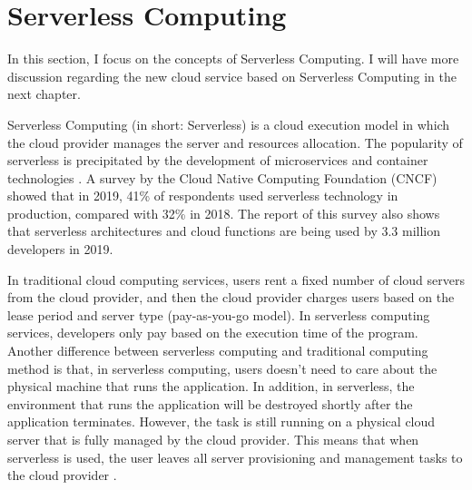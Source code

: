 \section{Serverless Computing}
In this section, I focus on the concepts of Serverless Computing. I will have more discussion regarding the new cloud service based on Serverless Computing in the next chapter.
\par
Serverless Computing (in short: Serverless) is a cloud execution model in which the cloud provider manages the server and resources allocation. 
The popularity of serverless is precipitated by the development of microservices and container technologies \cite{baldini2017serverless}. A survey by the Cloud Native Computing Foundation (CNCF) showed that in 2019, 41\% of respondents used serverless technology in production, compared with 32\% in 2018\cite{cncf2020}. The report of this survey also shows that serverless architectures and cloud functions are being used by 3.3 million developers \cite{cncf2020} in 2019.
\par
In traditional cloud computing services, users rent a fixed number of cloud servers from the cloud provider, and then the cloud provider charges users based on the lease period and server type (pay-as-you-go model). In serverless computing services, developers only pay based on the execution time of the program.
Another difference between serverless computing and traditional computing method is that, in serverless computing, users doesn't need to care about the physical machine that runs the application. In addition, in serverless, the environment that runs the application will be destroyed shortly after the application terminates. 
However, the task is still running on a physical cloud server that is fully managed by the cloud provider. This means that when serverless is used, the user leaves all server provisioning and management tasks to the cloud provider \cite{jonas2019cloud}.

